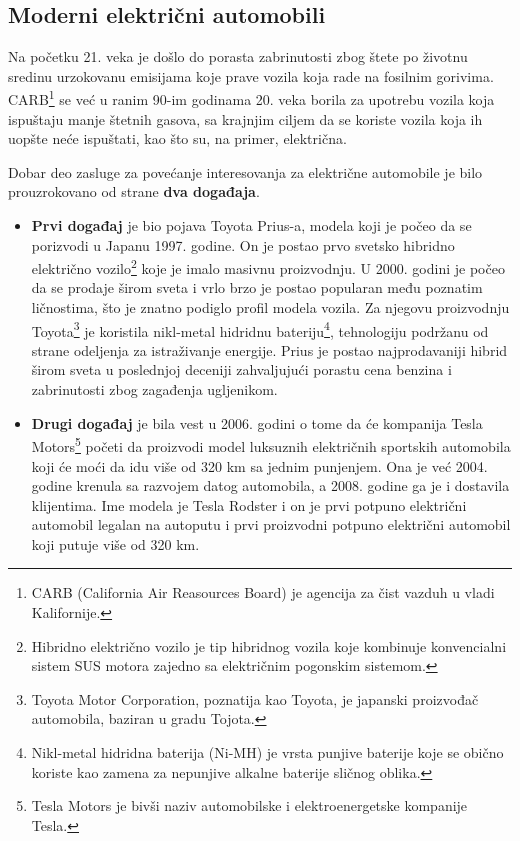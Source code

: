\documentclass[a4paper]{article}
\begin{document}
\subsection{Moderni električni automobili}
\label{subsec:podnaslov2}


Na početku 21. veka je došlo do porasta zabrinutosti zbog štete po životnu sredinu urzokovanu emisijama koje prave vozila koja rade na fosilnim gorivima. CARB\footnote{CARB (California Air Reasources Board) je agencija za čist vazduh u vladi Kalifornije.} se već u ranim 90-im godinama 20. veka borila za upotrebu vozila koja ispuštaju manje štetnih gasova, sa krajnjim ciljem da se koriste vozila koja ih uopšte neće ispuštati, kao što su, na primer, električna.

Dobar deo zasluge za povećanje interesovanja za električne automobile je bilo prouzrokovano od strane \textbf{dva događaja}.

\begin{itemize}
\item  \textbf{Prvi događaj} je bio pojava Toyota Prius-a, modela koji je počeo da se porizvodi u Japanu 1997. godine. On je postao prvo svetsko hibridno električno vozilo\footnote{Hibridno električno vozilo je tip hibridnog vozila koje kombinuje konvencialni sistem SUS motora zajedno sa električnim pogonskim sistemom.} koje je imalo masivnu proizvodnju. U 2000. godini je počeo da se prodaje širom sveta i vrlo brzo je postao popularan među poznatim ličnostima, što je znatno podiglo profil modela vozila. Za njegovu proizvodnju Toyota\footnote{Toyota Motor Corporation, poznatija kao Toyota, je japanski proizvođač automobila, baziran u gradu Tojota.} je koristila nikl-metal hidridnu bateriju\footnote{Nikl-metal hidridna baterija (Ni-MH) je vrsta punjive baterije koje se obično koriste kao zamena za nepunjive alkalne baterije sličnog oblika.}, tehnologiju podržanu od strane odeljenja za istraživanje energije. Prius je postao najprodavaniji hibrid širom sveta u poslednjoj deceniji zahvaljujući porastu cena benzina i zabrinutosti zbog zagađenja ugljenikom.
\item \textbf{Drugi događaj} je bila vest u 2006. godini o tome da će kompanija Tesla Motors\footnote{Tesla Motors je bivši naziv automobilske i elektroenergetske kompanije Tesla.} početi da proizvodi model luksuznih električnih sportskih automobila koji će moći da idu više od 320 km sa jednim punjenjem. Ona je već 2004. godine krenula  sa razvojem datog automobila, a 2008. godine ga je i dostavila klijentima. Ime modela je Tesla Rodster i on je prvi potpuno električni automobil legalan na autoputu i prvi proizvodni potpuno električni automobil koji putuje više od 320 km.
\end{itemize} 
\end{document}
